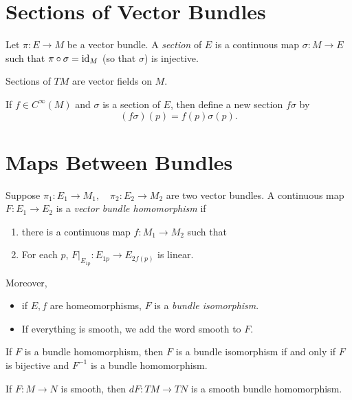 \section{Sections of Vector Bundles}\label{section of VB}
Let $\pi:E \to M$ be a vector bundle. A \textit{section} of $E$ is a continuous map $\sigma: M \to E$ such that $\pi \circ \sigma = \mathrm{id}_M$ (so that $\sigma$) is injective. 
\begin{example}
    Sections of $TM$ are vector fields on $M$. 
\end{example}
\begin{definition}
    If $f \in C^\infty(M)$ and $\sigma$ is a section of $E$, then define a new section $f \sigma$ by 
    $$(f\sigma)(p) = f(p)\sigma(p). $$
\end{definition}


\section{Maps Between Bundles}
\begin{definition}
    Suppose $\pi_1:E_1 \to M_1, \quad \pi_2:E_2 \to M_2$ are two vector bundles. A continuous map $F:E_1 \to E_2$ is a \textit{vector bundle homomorphism} if
    \begin{enumerate}
    \item there is a continuous map $f:M_1 \to M_2$ such that 
    \begin{center}
    \end{center}
    \item For each $p$, $F|_{E_{1p}}: E_{1p} \to E_{2f(p)}$ is linear.
    \end{enumerate}
    Moreover, 
    \begin{itemize}
    \item if $E,f$ are homeomorphisms, $F$ is a \textit{bundle isomorphism}.
    \item If everything is smooth, we add the word smooth to $F$.
    \end{itemize}
\end{definition}
\begin{remark}
    If $F$ is a bundle homomorphism, then $F$ is a bundle isomorphism if and only if $F$ is bijective and $F^{-1}$ is a bundle homomorphism. 
\end{remark}
\begin{example}
    If $F:M \to N$ is smooth, then $dF:TM \to TN$ is a smooth bundle homomorphism. 
\end{example}